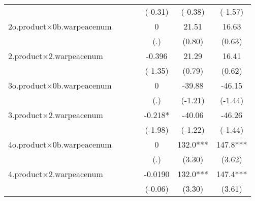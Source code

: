 {\begin{tabular}{l*{6}{c}}
                    &                     &                     &                     &     (-0.31)         &     (-0.38)         &     (-1.57)         \\
[1em]
2o.product$\times$0b.warpeacenum&                     &                     &                     &           0         &       21.51         &       16.63         \\
                    &                     &                     &                     &         (.)         &      (0.80)         &      (0.63)         \\
[1em]
2.product$\times$2.warpeacenum&                     &                     &                     &      -0.396         &       21.29         &       16.41         \\
                    &                     &                     &                     &     (-1.35)         &      (0.79)         &      (0.62)         \\
[1em]
3o.product$\times$0b.warpeacenum&                     &                     &                     &           0         &      -39.88         &      -46.15         \\
                    &                     &                     &                     &         (.)         &     (-1.21)         &     (-1.44)         \\
[1em]
3.product$\times$2.warpeacenum&                     &                     &                     &      -0.218*  &      -40.06         &      -46.26         \\
                    &                     &                     &                     &     (-1.98)         &     (-1.22)         &     (-1.44)         \\
[1em]
4o.product$\times$0b.warpeacenum&                     &                     &                     &           0         &       132.0***&       147.8***\\
                    &                     &                     &                     &         (.)         &      (3.30)         &      (3.62)         \\
[1em]
4.product$\times$2.warpeacenum&                     &                     &                     &     -0.0190         &       132.0***&       147.4***\\
                    &                     &                     &                     &     (-0.06)         &      (3.30)         &      (3.61)         \\

\end{tabular}}
